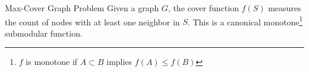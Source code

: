 \documentclass{beamer} %
\begin{document}
\begin{frame}{Max-Cover Graph Problem} %
Given a graph $G$, the cover function $f(S)$ measures the count of nodes with at least one neighbor in $S$. This is a canonical monotone\footnote{$f$ is monotone if $A \subset B$ implies $f(A) \leq f(B)$} submodular function.
\begin{figure}[t]
\begin{center}



\end{center}
\end{figure}
\end{frame}
\end{document}
